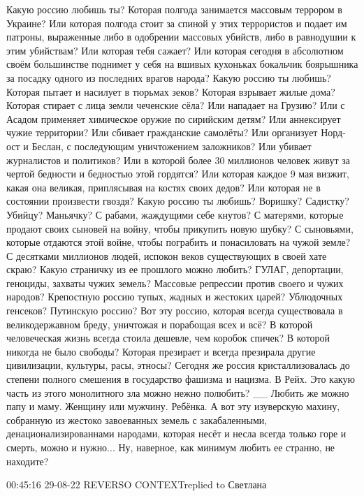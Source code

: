 Какую россию любишь ты?
Которая полгода занимается массовым террором в Украине?
Или которая полгода стоит за спиной у этих террористов и подает им патроны, выраженные либо в одобрении массовых убийств, либо в равнодушии к этим убийствам?
Или которая тебя сажает?
Или которая сегодня в абсолютном своём большинстве поднимет у себя на вшивых кухоньках бокальчик боярышника за посадку одного из последних врагов народа?
Какую россию ты любишь?
Которая пытает и насилует в тюрьмах зеков?
Которая взрывает жилые дома?
Которая стирает с лица земли чеченские сёла?
Или нападает на Грузию?
Или с Асадом применяет химическое оружие по сирийским детям?
Или аннексирует чужие территории?
Или сбивает гражданские самолёты?
Или организует Норд-ост и Беслан, с последующим уничтожением заложников?
Или убивает журналистов и политиков?
Или в которой более 30 миллионов человек живут за чертой бедности и бедностью этой гордятся?
Или которая каждое 9 мая визжит, какая она великая, приплясывая на костях своих дедов?
Или которая не в состоянии произвести гвоздя?
Какую россию ты любишь?
Воришку? Садистку? Убийцу? Маньячку?
С рабами, жаждущими себе кнутов? С матерями, которые продают своих сыновей на войну, чтобы прикупить новую шубку? С сыновьями, которые отдаются этой войне, чтобы пограбить и понасиловать на чужой земле?
С десятками миллионов людей, испокон веков существующих в своей хате скраю?
Какую страничку из ее прошлого можно любить? ГУЛАГ, депортации, геноциды, захваты чужих земель? Массовые репрессии против своего и чужих народов?
Крепостную россию тупых, жадных и жестоких царей?
Ублюдочных генсеков?
Путинскую россию?
Вот эту россию, которая всегда существовала в великодержавном бреду, уничтожая и порабощая всех и всё?
В которой человеческая жизнь всегда стоила дешевле, чем коробок спичек? В которой никогда не было свободы? Которая презирает и всегда презирала другие цивилизации, культуры, расы, этносы?
Сегодня же россия кристаллизовалась до степени полного смешения в государство фашизма и нацизма. В Рейх. Это какую часть из этого монолитного зла можно нежно полюбить?
__
Любить же можно папу и маму. Женщину или мужчину. Ребёнка.
А вот эту изуверскую махину, собранную из жестоко завоеванных земель с закабаленными, денационализированнами народами, которая несёт и несла всегда только горе и смерть, можно и нужно...
Ну, наверное, как минимум любить ее странно, не находите?


00:45:16 29-08-22
REVERSO CONTEXTreplied to Светлана


